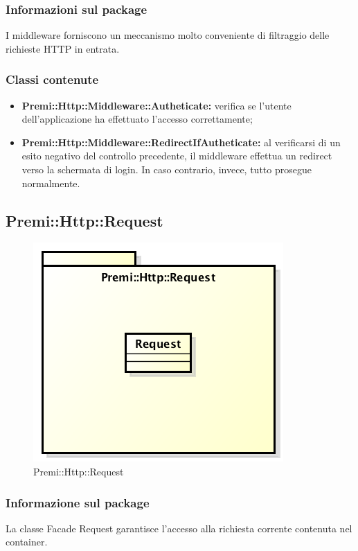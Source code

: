 	\subsubsection*{Informazioni sul package}
	I middleware forniscono un meccanismo molto conveniente di filtraggio delle richieste HTTP in entrata.
	\subsubsection*{Classi contenute}
		\begin{itemize}
			\item \textbf{Premi::Http::Middleware::Autheticate:} verifica se l'utente dell'applicazione ha effettuato l'accesso correttamente;
			\item \textbf{Premi::Http::Middleware::RedirectIfAutheticate:} al verificarsi di un esito negativo del controllo precedente, il middleware effettua un redirect verso la schermata di login. In caso contrario, invece, tutto prosegue normalmente.
		\end{itemize}
\newpage
\subsection{Premi::Http::Request}
\begin{figure}[h]
\centering
\includegraphics[width=0.7\linewidth]{img/premi_http_request}
\caption[Premi::Http::Request]{Premi::Http::Request}
\label{fig:premi_http_request}
\end{figure}
	\subsubsection*{Informazione sul package}
	La classe Facade Request garantisce l'accesso alla richiesta corrente contenuta nel container.

